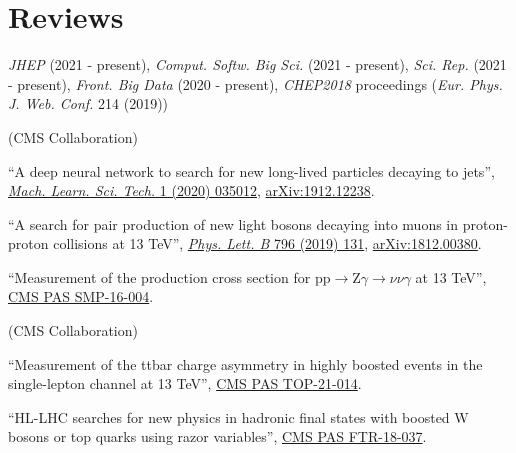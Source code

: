 \section{Reviews}
\begin{description}[leftmargin=12pt,font=\normalfont\textit]
\item[Journal referee:]
\begin{description}[leftmargin=12pt,font=\normalfont,labelsep=0em]\item[]
\item \emph{JHEP} (2021 - present), \emph{Comput. Softw. Big Sci.} (2021 - present), \emph{Sci. Rep.} (2021 - present), \emph{Front. Big Data} (2020 - present), \emph{CHEP2018} proceedings (\emph{Eur. Phys. J. Web. Conf.} 214 (2019))
\end{description}
\item[Analysis Review Committee (ARC) member:] (CMS Collaboration)
\begin{description}[leftmargin=12pt,font=\normalfont,labelsep=0em]
\item ``A deep neural network to search for new long-lived particles decaying to jets'', \href{https://doi.org/10.1088/2632-2153/ab9023}{\emph{Mach. Learn. Sci. Tech.} 1 (2020) 035012}, \href{https://arxiv.org/abs/1912.12238}{arXiv:1912.12238}.
\item \begin{sloppypar}``A search for pair production of new light bosons decaying into muons in proton-proton collisions at 13 TeV'', \href{http://dx.doi.org/10.1016/j.physletb.2019.07.013}{\emph{Phys. Lett. B} 796 (2019) 131}, \href{https://arxiv.org/abs/1812.00380}{arXiv:1812.00380}.\end{sloppypar}
\item ``Measurement of the production cross section for $\text{p}\text{p} \to \text{Z}\gamma \to \nu\nu\gamma$ at 13 TeV'', \href{https://cds.cern.ch/record/2204922}{CMS PAS SMP-16-004}.
\end{description}
\item[CMS Certified Language Editor (CCLE):] (CMS Collaboration)
\begin{description}[leftmargin=12pt,font=\normalfont,labelsep=0em]
\item ``Measurement of the ttbar charge asymmetry in highly boosted events in the single-lepton channel at 13 TeV'', \href{http://cds.cern.ch/record/2809614}{CMS PAS TOP-21-014}.
\item ``HL-LHC searches for new physics in hadronic final states with boosted W bosons or top quarks using razor variables'', \href{https://cds.cern.ch/record/2658262}{CMS PAS FTR-18-037}.

\end{description}
\end{description}
